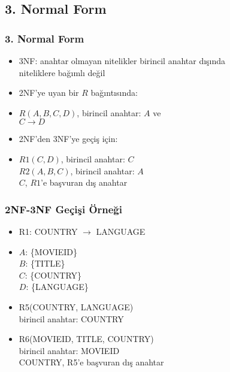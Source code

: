 \documentclass[dvipsnames]{beamer}
\theoremstyle{theorem}
\begin{document}
\subsection{3. Normal Form}

\begin{frame}
  \frametitle{3. Normal Form}

  \begin{itemize}
    \item \alert{3NF}: anahtar olmayan nitelikler birincil anahtar dışında\\
      niteliklere bağımlı değil


  \pause
  \medskip
      \item 2NF'ye uyan bir $R$ bağıntısında:
      \item $R(A,B,C,D)$, birincil anahtar: $A$ ve \\
        $C \rightarrow D$

      \medskip
      \item 2NF'den 3NF'ye geçiş için:
        \item $R1(C,D)$, birincil anahtar: $C$\\
          $R2(A,B,C)$, birincil anahtar: $A$\\
          $C$, $R1$'e başvuran dış anahtar
    \end{itemize}

\end{frame}

\begin{frame}
  \frametitle{2NF-3NF Geçişi Örneği}

    \begin{itemize}
      \item R1: COUNTRY $\rightarrow$ LANGUAGE
      \item $A$: \{MOVIEID\}\\
      $B$: \{TITLE\}\\
      $C$: \{COUNTRY\}\\
      $D$: \{LANGUAGE\}

    \pause
    \medskip
      \item R5(COUNTRY, LANGUAGE)\\
        birincil anahtar: COUNTRY

      \item R6(MOVIEID, TITLE, COUNTRY)\\
        birincil anahtar: MOVIEID\\
        COUNTRY, R5'e başvuran dış anahtar
    \end{itemize}
\end{frame}
\end{document}
